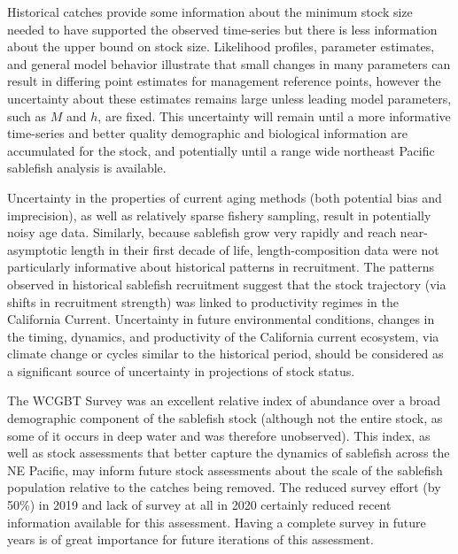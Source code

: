 \documentclass[11pt,
  english,
  a4paper,
]{article}
\begin{document}
\leavevmode\tagmcend\tagstructend\par


Historical catches provide some information about the minimum stock size needed to have supported the observed time-series but there is less information about the upper bound on stock size. Likelihood profiles, parameter estimates, and general model behavior illustrate that small changes in many parameters can result in differing point estimates for management reference points, however the uncertainty about these estimates remains large unless leading model parameters, such as {\(M\)\leavevmode\tagmcend\tagstructend} and {\(h\)\leavevmode\tagmcend\tagstructend}, are fixed. This uncertainty will remain until a more informative time-series and better quality demographic and biological information are accumulated for the stock, and potentially until a range wide northeast Pacific sablefish analysis is available.

\leavevmode\tagmcend\tagstructend\par


Uncertainty in the properties of current aging methods (both potential bias and imprecision), as well as relatively sparse fishery sampling, result in potentially noisy age data. Similarly, because sablefish grow very rapidly and reach near-asymptotic length in their first decade of life, length-composition data were not particularly informative about historical patterns in recruitment. The patterns observed in historical sablefish recruitment suggest that the stock trajectory (via shifts in recruitment strength) was linked to productivity regimes in the California Current. Uncertainty in future environmental conditions, changes in the timing, dynamics, and productivity of the California current ecosystem, via climate change or cycles similar to the historical period, should be considered as a significant source of uncertainty in projections of stock status.

\leavevmode\tagmcend\tagstructend\par


The WCGBT Survey was an excellent relative index of abundance over a broad demographic component of the sablefish stock (although not the entire stock, as some of it occurs in deep water and was therefore unobserved). This index, as well as stock assessments that better capture the dynamics of sablefish across the NE Pacific, may inform future stock assessments about the scale of the sablefish population relative to the catches being removed. The reduced survey effort (by 50\%) in 2019 and lack of survey at all in 2020 certainly reduced recent information available for this assessment. Having a complete survey in future years is of great importance for future iterations of this assessment.
\end{document}
